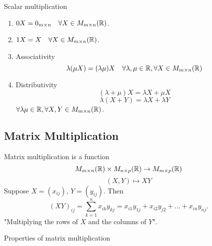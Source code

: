 \documentclass[10pt, a4paper]{article}
\begin{document}
Scalar multiplication
\begin{enumerate}[label = (\roman*)]
    \item $0X = 0_{m\times n}\quad\forall X \in M_{m \times n}(\mathbb{R})$.
    \item $1X = X\quad\forall X \in M_{m \times n}(\mathbb{R})$.
    \item Associativity
    \[
    \lambda(\mu X) = (\lambda \mu) X\quad \forall \lambda, \mu \in \mathbb{R}, \forall X \in M_{m \times n}(\mathbb{R}) 
    \]
    \item Distributivity
    \[
    (\lambda + \mu)X = \lambda X + \mu X
    \]
    \[
    \lambda(X + Y) = \lambda X + \lambda Y
    \]
    $\forall \lambda \mu \in \mathbb{R}, \forall X, Y \in M_{m \times n}(\mathbb{R})$.
\end{enumerate}

\subsection{Matrix Multiplication}

\begin{definition}
    Matrix multiplication is a function
    \[
    M_{m \times n}(\mathbb{R}) \times M_{n \times p}(\mathbb{R}) \rightarrow M_{m \times p}(\mathbb{R})
    \]
    \[
    (X, Y) \mapsto XY
    \]
    Suppose $X = (x_{ij}),\, Y = (y_{ij})$. Then
    \[
    (XY)_{ij} = \sum_{k = 1}^{n}x_{ik}y_{kj} = x_{i1}y_{1j} + x_{i2}y_{j2} + \dotsc + x_{in}y_{nj}. 
    \]
    "Multiplying the rows of $X$ and the columns of $Y$".
\end{definition}

Properties of matrix multiplication
\end{document}
